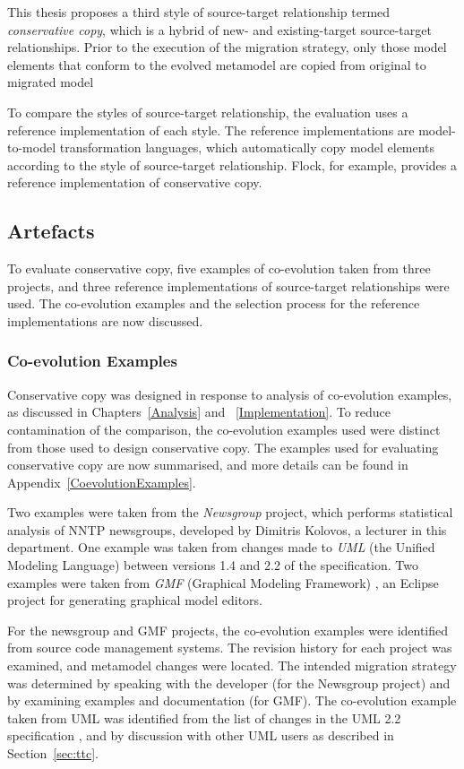 This thesis proposes a third style of source-target relationship termed \emph{conservative copy}, which is a hybrid of new- and existing-target source-target relationships. Prior to the execution of the migration strategy, only those model elements that conform to the evolved metamodel are copied from original to migrated model

To compare the styles of source-target relationship, the evaluation uses a reference implementation of each style. The reference implementations are model-to-model transformation languages, which automatically copy model elements according to the style of source-target relationship. Flock, for example, provides a reference implementation of conservative copy.


\subsection{Artefacts}
\label{subsec:quantitive_equipment}
To evaluate conservative copy, five examples of co-evolution taken from three projects, and three reference implementations of source-target relationships were used. The co-evolution examples and the selection process for the reference implementations are now discussed.

\subsubsection{Co-evolution Examples}
Conservative copy was designed in response to analysis of co-evolution examples, as discussed in Chapters~\ref{Analysis} and ~\ref{Implementation}. To reduce contamination of the comparison, the co-evolution examples used were distinct from those used to design conservative copy. The examples used for evaluating conservative copy are now summarised, and more details can be found in Appendix~\ref{CoevolutionExamples}.

Two examples were taken from the \emph{Newsgroup} project, which performs statistical analysis of NNTP newsgroups, developed by Dimitris Kolovos, a lecturer in this department. One example was taken from changes made to \emph{UML} (the Unified Modeling Language) between versions 1.4 \cite{uml14} and 2.2 \cite{uml22} of the specification. Two examples were taken from \emph{GMF} (Graphical Modeling Framework) \cite{gronback09emp}, an Eclipse project for generating graphical model editors.

For the newsgroup and GMF projects, the co-evolution examples were identified from source code management systems. The revision history for each project was examined, and metamodel changes were located. The intended migration strategy was determined by speaking with the developer (for the Newsgroup project) and by examining examples and documentation (for GMF). The co-evolution example taken from UML was identified from the list of changes in the UML 2.2 specification \cite{uml22}, and by discussion with other UML users as described in Section~\ref{sec:ttc}.

